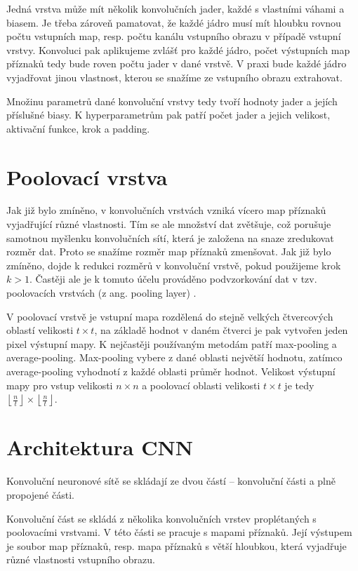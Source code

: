 Jedná vrstva může mít několik konvolučních jader, každé s vlastními váhami a
biasem. Je třeba zároveň pamatovat, že každé jádro musí mít hloubku rovnou
počtu vstupních map, resp. počtu kanálu vstupního obrazu v případě vstupní
vrstvy. Konvoluci pak aplikujeme zvlášť pro každé jádro, počet výstupních map
příznaků tedy bude roven počtu jader v dané vrstvě. V praxi bude každé jádro
vyjadřovat jinou vlastnost, kterou se snažíme ze vstupního obrazu extrahovat.

Množinu parametrů dané konvoluční vrstvy tedy tvoří hodnoty jader a jejích
příslušné biasy. K hyperparametrům pak patří počet jader a jejich velikost,
aktivační funkce, krok a padding.

\section{Poolovací vrstva}
Jak již bylo zmíněno, v konvolučních vrstvách vzniká vícero map příznaků
vyjadřující různé vlastnosti. Tím se ale množství dat zvětšuje, což porušuje
samotnou myšlenku konvolučních sítí, která je založena na snaze zredukovat
rozměr dat. Proto se snažíme rozměr map příznaků zmenšovat. Jak již bylo
zmíněno, dojde k redukci rozměrů v konvoluční vrstvě, pokud použijeme krok $k >
    1$. Častěji ale je k tomuto účelu prováděno podvzorkování dat v tzv.
poolovacích vrstvách (z ang. pooling layer) \cite{rawat2017deep}.

V poolovací vrstvě je vstupní mapa rozdělená do stejně velkých čtvercových
oblastí velikosti $t \times t$, na základě hodnot v daném čtverci je pak
vytvořen jeden pixel výstupní mapy. K nejčastěji používaným metodám patří
max-pooling a average-pooling. Max-pooling vybere z dané oblasti největší
hodnotu, zatímco average-pooling vyhodnotí z každé oblasti průměr hodnot.
Velikost výstupní mapy pro vstup velikosti $n \times n$ a poolovací oblasti
velikosti $t \times t$ je tedy $\left\lfloor \frac{n}{t} \right\rfloor \times
    \left\lfloor \frac{n}{t} \right\rfloor$.

\section{Architektura CNN}

Konvoluční neuronové sítě se skládají ze dvou částí – konvoluční části a plně
propojené části.

Konvoluční část se skládá z několika konvolučních vrstev proplétaných s
poolovacími vrstvami. V této části se pracuje s mapami příznaků. Její výstupem
je soubor map příznaků, resp. mapa příznaků s větší hloubkou, která vyjadřuje
různé vlastnosti vstupního obrazu.

